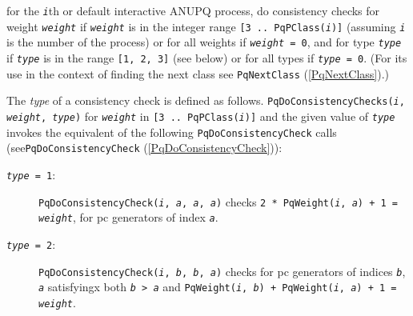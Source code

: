 \documentclass[a4paper,11pt]{report}
\begin{document}
{{{ for the \mbox{\texttt{\mdseries\slshape i}}th or default interactive \textsf{ANUPQ} process, do consistency checks for weight \mbox{\texttt{\mdseries\slshape weight}} if \mbox{\texttt{\mdseries\slshape weight}} is in the integer range \texttt{[3 .. PqPClass(\mbox{\texttt{\mdseries\slshape i}})]} (assuming \mbox{\texttt{\mdseries\slshape i}} is the number of the process) or for all weights if \texttt{\mbox{\texttt{\mdseries\slshape weight}} = 0}, and for type \mbox{\texttt{\mdseries\slshape type}} if \mbox{\texttt{\mdseries\slshape type}} is in the range \texttt{[1, 2, 3]} (see below) or for all types if \texttt{\mbox{\texttt{\mdseries\slshape type}} = 0}. (For its use in the context of finding the next class see \texttt{PqNextClass} (\ref{PqNextClass}).) 

 The \emph{type} of a consistency check is defined as follows. \texttt{PqDoConsistencyChecks(\mbox{\texttt{\mdseries\slshape i}}, \mbox{\texttt{\mdseries\slshape weight}}, \mbox{\texttt{\mdseries\slshape type}})} for \mbox{\texttt{\mdseries\slshape weight}} in \texttt{[3 .. PqPClass(\mbox{\texttt{\mdseries\slshape i}})]} and the given value of \mbox{\texttt{\mdseries\slshape type}} invokes the equivalent of the following \texttt{PqDoConsistencyCheck} calls (see{\nobreakspace}\texttt{PqDoConsistencyCheck} (\ref{PqDoConsistencyCheck})): 
\begin{description}
\item[{\texttt{\mbox{\texttt{\mdseries\slshape type}} = 1}:}]  \texttt{PqDoConsistencyCheck(\mbox{\texttt{\mdseries\slshape i}}, \mbox{\texttt{\mdseries\slshape a}}, \mbox{\texttt{\mdseries\slshape a}}, \mbox{\texttt{\mdseries\slshape a}})} checks \texttt{2 * PqWeight(\mbox{\texttt{\mdseries\slshape i}}, \mbox{\texttt{\mdseries\slshape a}}) + 1 = \mbox{\texttt{\mdseries\slshape weight}}}, for pc generators of index \mbox{\texttt{\mdseries\slshape a}}. 
\item[{\texttt{\mbox{\texttt{\mdseries\slshape type}} = 2}:}]  \texttt{PqDoConsistencyCheck(\mbox{\texttt{\mdseries\slshape i}}, \mbox{\texttt{\mdseries\slshape b}}, \mbox{\texttt{\mdseries\slshape b}}, \mbox{\texttt{\mdseries\slshape a}})} checks for pc generators of indices \mbox{\texttt{\mdseries\slshape b}}, \mbox{\texttt{\mdseries\slshape a}} satisfyingx both \texttt{\mbox{\texttt{\mdseries\slshape b}} {\textgreater} \mbox{\texttt{\mdseries\slshape a}}} and \texttt{PqWeight(\mbox{\texttt{\mdseries\slshape i}}, \mbox{\texttt{\mdseries\slshape b}}) + PqWeight(\mbox{\texttt{\mdseries\slshape i}}, \mbox{\texttt{\mdseries\slshape a}}) + 1 = \mbox{\texttt{\mdseries\slshape weight}}}. 

\end{description}}}}
\end{document}
